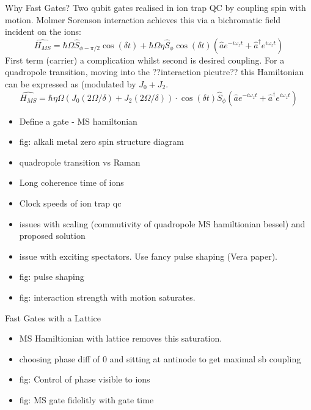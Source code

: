 \documentclass[final]{beamer}
\begin{document}
\begin{frame}{}
\begin{center}
\begin{columns}[t]
\begin{column}{0.49\textwidth}
    \begin{block}{Why Fast Gates?}
      Two qubit gates realised in ion trap QC by coupling spin with motion. Molmer Sorenson interaction achieves this via a bichromatic field incident on the ions:
      $$ \hat{H_{MS}} = \hbar\Omega \hat{S}_{\phi-\pi/2}\cos{(\delta t)} + \hbar\Omega\eta \hat{S}_\phi\cos{(\delta t)}(\hat{a}e^{-i\omega_zt} + \hat{a}^\dagger e^{i\omega_zt})$$
      First term (carrier) a complication whilst second is desired coupling.
      For a quadropole transition, moving into the ??interaction picutre?? this Hamiltonian can be expressed as (modulated by $J_0+J_2$.
      $$ \hat{H_{MS}} = \hbar\eta\Omega(J_0(2\Omega/\delta) + J_2(2\Omega/\delta))\cdot \cos{(\delta t)}\hat{S}_{\phi}(\hat{a}e^{-i\omega_zt} + \hat{a}^\dagger e^{i\omega_zt})$$
      \begin{itemize}
      \item Define a gate - MS hamiltonian
      \item fig: alkali metal zero spin structure diagram
      \item quadropole transition vs Raman

      \item Long coherence time of ions 
      \item Clock speeds of ion trap qc
      \item issues with scaling (commutivity of quadropole MS hamiltionian bessel) and proposed solution
      \item issue with exciting spectators. Use fancy pulse shaping (Vera paper).
      \item fig: pulse shaping
      \item fig: interaction strength with motion saturates.
      \end{itemize}
    \end{block}


    \begin{block}{Fast Gates with a Lattice}
      \begin{itemize}
      \item MS Hamiltionian with lattice removes this saturation.
      \item choosing phase diff of 0 and sitting at antinode to get maximal sb coupling
      \item fig: Control of phase visible to ions
      \item fig: MS gate fidelitly with gate time
      \end{itemize}


\end{block}
\end{column}
\end{columns}
\end{center}
\end{frame}
\end{document}
